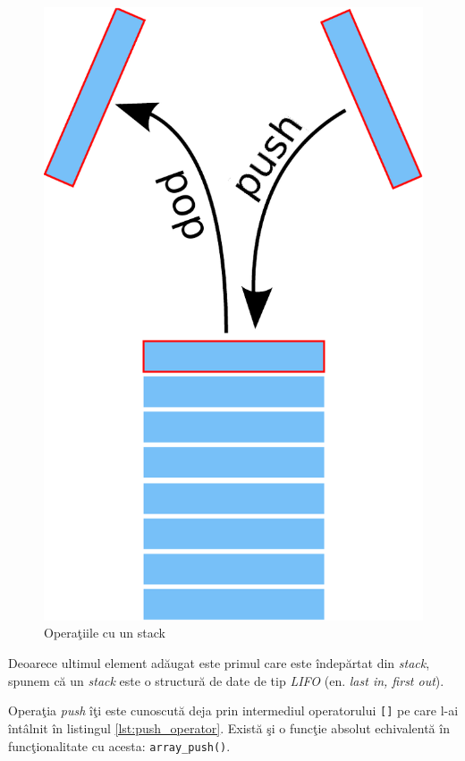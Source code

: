 \begin{figure}[h!]
  \centering
    \includegraphics[scale=.3]{cap03/stack-crop.pdf}
  \caption{Operaţiile cu un stack}
  \label{fig:stack}
\end{figure}

Deoarece ultimul element adăugat este primul care este îndepărtat
din \textit{stack}, spunem că un \textit{stack} este o structură de date
de tip \textsl{LIFO} (en. \textsl{last in, first out}).

Operaţia \textit{push} îţi este cunoscută deja prin intermediul
operatorului \texttt{[]} pe care l-ai întâlnit în
listingul \ref{lst:push_operator}. Există şi o funcţie
absolut echivalentă în funcţionalitate cu acesta: \texttt{array\_push()}.

